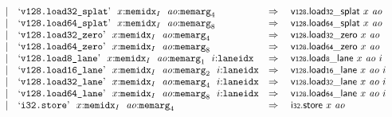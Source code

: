 $$\begin{array}[t]{@{}lrrl@{}l@{}l@{}l@{}}
& & | & \mbox{‘\texttt{v128.load32\_splat}’}~~x{:}{{\mathtt{memidx}}}_{I}~~{\mathit{ao}}{:}{{\mathtt{memarg}}}_{4} & \quad\Rightarrow\quad{} & {\mathsf{v{\scriptstyle 128}}{.}\mathsf{load}}{{\mathsf{{\scriptstyle 32}}}{\mathsf{\_}}{\mathsf{splat}}}~x~{\mathit{ao}} \\
& & | & \mbox{‘\texttt{v128.load64\_splat}’}~~x{:}{{\mathtt{memidx}}}_{I}~~{\mathit{ao}}{:}{{\mathtt{memarg}}}_{8} & \quad\Rightarrow\quad{} & {\mathsf{v{\scriptstyle 128}}{.}\mathsf{load}}{{\mathsf{{\scriptstyle 64}}}{\mathsf{\_}}{\mathsf{splat}}}~x~{\mathit{ao}} \\
& & | & \mbox{‘\texttt{v128.load32\_zero}’}~~x{:}{{\mathtt{memidx}}}_{I}~~{\mathit{ao}}{:}{{\mathtt{memarg}}}_{4} & \quad\Rightarrow\quad{} & {\mathsf{v{\scriptstyle 128}}{.}\mathsf{load}}{{\mathsf{{\scriptstyle 32}}}{\mathsf{\_}}{\mathsf{zero}}}~x~{\mathit{ao}} \\
& & | & \mbox{‘\texttt{v128.load64\_zero}’}~~x{:}{{\mathtt{memidx}}}_{I}~~{\mathit{ao}}{:}{{\mathtt{memarg}}}_{8} & \quad\Rightarrow\quad{} & {\mathsf{v{\scriptstyle 128}}{.}\mathsf{load}}{{\mathsf{{\scriptstyle 64}}}{\mathsf{\_}}{\mathsf{zero}}}~x~{\mathit{ao}} \\
& & | & \mbox{‘\texttt{v128.load8\_lane}’}~~x{:}{{\mathtt{memidx}}}_{I}~~{\mathit{ao}}{:}{{\mathtt{memarg}}}_{1}~~i{:}{\mathtt{laneidx}} & \quad\Rightarrow\quad{} & {\mathsf{v{\scriptstyle 128}}{.}\mathsf{load}}{\mathsf{{\scriptstyle 8}}}{\mathsf{\_}}{\mathsf{lane}}~x~{\mathit{ao}}~i \\
& & | & \mbox{‘\texttt{v128.load16\_lane}’}~~x{:}{{\mathtt{memidx}}}_{I}~~{\mathit{ao}}{:}{{\mathtt{memarg}}}_{2}~~i{:}{\mathtt{laneidx}} & \quad\Rightarrow\quad{} & {\mathsf{v{\scriptstyle 128}}{.}\mathsf{load}}{\mathsf{{\scriptstyle 16}}}{\mathsf{\_}}{\mathsf{lane}}~x~{\mathit{ao}}~i \\
& & | & \mbox{‘\texttt{v128.load32\_lane}’}~~x{:}{{\mathtt{memidx}}}_{I}~~{\mathit{ao}}{:}{{\mathtt{memarg}}}_{4}~~i{:}{\mathtt{laneidx}} & \quad\Rightarrow\quad{} & {\mathsf{v{\scriptstyle 128}}{.}\mathsf{load}}{\mathsf{{\scriptstyle 32}}}{\mathsf{\_}}{\mathsf{lane}}~x~{\mathit{ao}}~i \\
& & | & \mbox{‘\texttt{v128.load64\_lane}’}~~x{:}{{\mathtt{memidx}}}_{I}~~{\mathit{ao}}{:}{{\mathtt{memarg}}}_{8}~~i{:}{\mathtt{laneidx}} & \quad\Rightarrow\quad{} & {\mathsf{v{\scriptstyle 128}}{.}\mathsf{load}}{\mathsf{{\scriptstyle 64}}}{\mathsf{\_}}{\mathsf{lane}}~x~{\mathit{ao}}~i \\
& & | & \mbox{‘\texttt{i32.store}’}~~x{:}{{\mathtt{memidx}}}_{I}~~{\mathit{ao}}{:}{{\mathtt{memarg}}}_{4} & \quad\Rightarrow\quad{} & \mathsf{i{\scriptstyle 32}}{.}\mathsf{store}~x~{\mathit{ao}} \\

\end{array}$$
